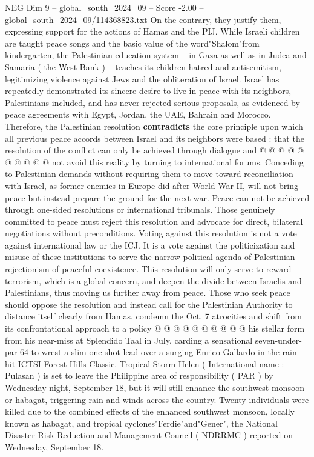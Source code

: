 \begin{textsample}{NEG Dim 9 – global\_south\_2024\_09 – Score -2.00 – global\_south\_2024\_09/114368823.txt}
On the contrary, they justify them, expressing support for the actions of Hamas and the PIJ.
While Israeli children are taught peace songs and the basic value of the word"Shalom"from kindergarten, the Palestinian education system -- in Gaza as well as in Judea and Samaria ( the West Bank ) -- teaches its children hatred and antisemitism, legitimizing violence against Jews and the obliteration of Israel.
Israel has repeatedly demonstrated its sincere desire to live in peace with its neighbors, Palestinians included, and has never rejected serious proposals, as evidenced by peace agreements with Egypt, Jordan, the UAE, Bahrain and Morocco.
Therefore, the Palestinian resolution \textbf{contradicts} the core principle upon which all previous peace accords between Israel and its neighbors were based : that the resolution of the conflict can only be achieved through dialogue and @ @ @ @ @ @ @ @ @ @ not avoid this reality by turning to international forums.
Conceding to Palestinian demands without requiring them to move toward reconciliation with Israel, as former enemies in Europe did after World War II, will not bring peace but instead prepare the ground for the next war.
Peace can not be achieved through one-sided resolutions or international tribunals.
Those genuinely committed to peace must reject this resolution and advocate for direct, bilateral negotiations without preconditions.
Voting against this resolution is not a vote against international law or the ICJ.
It is a vote against the politicization and misuse of these institutions to serve the narrow political agenda of Palestinian rejectionism of peaceful coexistence.
This resolution will only serve to reward terrorism, which is a global concern, and deepen the divide between Israelis and Palestinians, thus moving us further away from peace.
Those who seek peace should oppose the resolution and instead call for the Palestinian Authority to distance itself clearly from Hamas, condemn the Oct. 7 atrocities and shift from its confrontational approach to a policy @ @ @ @ @ @ @ @ @ @ his stellar form from his near-miss at Splendido Taal in July, carding a sensational seven-under-par 64 to wrest a slim one-shot lead over a surging Enrico Gallardo in the rain-hit ICTSI Forest Hills Classic.
Tropical Storm Helen ( International name : Pulasan ) is set to leave the Philippine area of responsibility ( PAR ) by Wednesday night, September 18, but it will still enhance the southwest monsoon or habagat, triggering rain and winds across the country.
Twenty individuals were killed due to the combined effects of the enhanced southwest monsoon, locally known as habagat, and tropical cyclones"Ferdie"and"Gener", the National Disaster Risk Reduction and Management Council ( NDRRMC ) reported on Wednesday, September 18.

\end{textsample}
